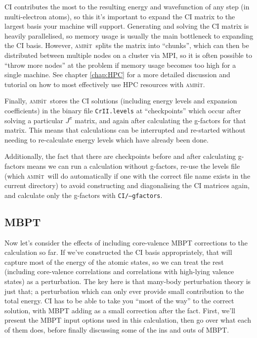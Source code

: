 \documentclass{report}
\newcommand{\ambit}{\textsc{amb}{\footnotesize i}\textsc{t}}
\begin{document}
CI contributes the most to the resulting energy and wavefunction of any step (in multi-electron atoms),
so this it's important to expand the CI matrix to the largest basis your machine will support.
Generating and solving the CI matrix is heavily parallelised, so memory usage is usually the main
bottleneck to expanding the CI basis. However, \ambit\  splits the matrix into ``chunks'', which can then
be distributed between multiple nodes on a cluster via MPI, so it is often possible to ``throw more
nodes'' at the problem if memory usage becomes too high for a single machine. See chapter \ref{chap:HPC}
for a more detailed discussion and tutorial on how to most effectively use HPC resources with \ambit.

Finally, \ambit\  stores the CI solutions (including energy levels and expansion coefficients) in the 
binary file \texttt{CrII.levels} at ``checkpoints'' which occur after solving a particular $J^{\pi}$ 
matrix, and again after calculating the g-factors for that matrix. This means that calculations can be
interrupted and re-started without needing to re-calculate energy levels which have already been done.

Additionally, the fact that there are checkpoints before and after calculating g-factors means we can
run a calculation without g-factors, re-use the levels file (which \ambit\  will do automatically if one 
with the correct file name exists in the current directory) to avoid constructing and diagonalising 
the CI matrices again, and calculate only the g-factors with \texttt{CI/--gfactors}.

\subsection{MBPT}

Now let's consider the effects of including core-valence MBPT corrections to the calculation so far. If 
we've constructed the CI basis appropriately, that will capture most of the energy of the atomic states,
so we can treat the rest (including core-valence correlations and correlations with high-lying valence 
states) as a perturbation. The key here is that many-body perturbation theory is just that; a 
perturbation which can only ever provide small contribution to the total energy. CI has to be able to 
take you ``most of the way'' to the correct solution, with MBPT adding as a small correction after the 
fact. First, we'll present the MBPT input options used in this calculation, then go over what each of 
them does, before finally discussing some of the ins and outs of MBPT.
\end{document}
